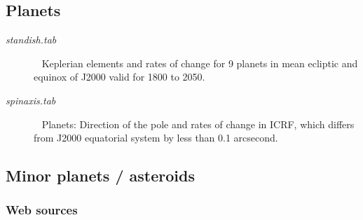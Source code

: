 \documentclass[draft]{article}
\begin{document}
\subsection{Planets} 

\begin{description} 
 \item [\textit{standish.tab}] \ \cite{Standish06} Keplerian elements and rates of change for 9 planets in mean ecliptic and equinox of J2000 valid for 1800 to 2050.

 \item [\textit{spinaxis.tab}] \ \cite{Archinal11} Planets: Direction of the pole and rates of change in ICRF, which differs from J2000 equatorial system by less than 0.1 arcsecond.
\end{description}

\subsection{Minor planets / asteroids} 

\subsubsection{Web sources} %
\end{document}
